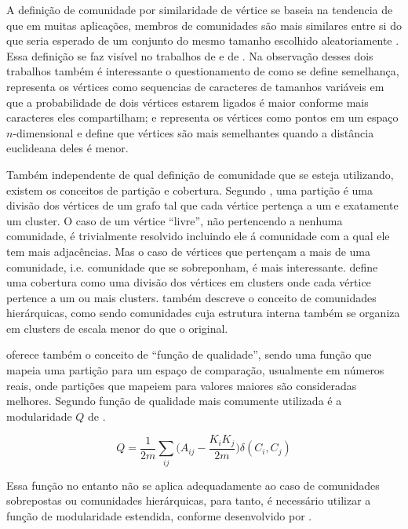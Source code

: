\documentclass[notes.tex]{subfiles}
\begin{document}
A definição de comunidade por similaridade de vértice se baseia na tendencia de que em muitas aplicações, membros de comunidades são mais similares entre si do que seria esperado de um conjunto do mesmo tamanho escolhido aleatoriamente \cite{fortunato2010community}.
Essa definição se faz visível no trabalhos de  e de .
Na observação desses dois trabalhos também é interessante o questionamento de como se define semelhança,  representa os vértices como sequencias de caracteres de tamanhos variáveis em que a probabilidade de dois vértices estarem ligados é maior conforme mais caracteres eles compartilham; e  representa os vértices como pontos em um espaço $n$-dimensional e define que vértices são mais semelhantes quando a distância euclideana deles é menor.

Também independente de qual definição de comunidade que se esteja utilizando, existem os conceitos de partição e cobertura.
Segundo , uma partição é uma divisão dos vértices de um grafo tal que cada vértice pertença a um e exatamente um cluster.
O caso de um vértice ``livre'', não pertencendo a nenhuma comunidade, é trivialmente resolvido incluindo ele á comunidade com a qual ele tem mais adjacências.
Mas o caso de vértices que pertençam a mais de uma comunidade, i.e. comunidade que se sobreponham, é mais interessante.
 define uma cobertura como uma divisão dos vértices em clusters onde cada vértice pertence a um ou mais clusters.
 também descreve o conceito de comunidades hierárquicas, como sendo comunidades cuja estrutura interna também se organiza em clusters de escala menor do que o original.

 oferece também o conceito de ``função de qualidade'', sendo uma função que mapeia uma partição para um espaço de comparação, usualmente em números reais, onde partições que mapeiem para valores maiores são consideradas melhores.
Segundo  função de qualidade mais comumente utilizada é a modularidade $Q$ de .

\begin{equation}\label{eq:mod}
    Q = \frac{1}{2m}\sum_{ij}\Bigg(A_{ij}-\frac{K_iK_j}{2m}\Bigg)\delta(C_i, C_j)
\end{equation}

Essa função no entanto não se aplica adequadamente ao caso de comunidades sobrepostas ou comunidades hierárquicas, para tanto, é necessário utilizar a função de modularidade estendida, conforme desenvolvido por .
\end{document}
